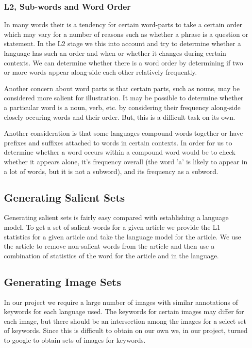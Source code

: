 \documentclass[12pt]{article}
\begin{document}
\subsubsection{L2, Sub-words and Word Order}
In many words their is a tendency for certain word-parts to take a certain order which may vary for a number of reasons such as whether a phrase is a question or statement. In the L2 stage we this into account and try to determine whether a language has such an order and when or whether it changes during certain contexts. We can determine whether there is a word order by determining if two or more words appear along-side each other relatively frequently.

Another concern about word parts is that certain parts, such as nouns, may be considered more salient for illustration. It may be possible to determine whether a particular word is a noun, verb, etc. by considering their frequency along-side closely occuring words and their order. But, this is a difficult task on its own.

Another consideration is that some languages compound words together or have prefixes and suffixes attached to words in certain contexts. 
In order for us to determine whether a word occurs within a compound word would be to check whether it appears alone, 
it's frequency overall (the word 'a' is likely to appear in a lot of words, but it is not a subword), and its frequency as a subword.

\subsection{Generating Salient Sets}
Generating salient sets is fairly easy compared with establishing a language model. To get a set of salient-words for a given article we provide the L1 statistics for a given article and take the language model for the article. We use the article to remove non-salient words from the article and then use a combination of statistics of the word for the article and in the language.

\subsection{Generating Image Sets}
In our project we require a large number of images with similar annotations of keywords for each language used. The keywords for certain images may differ for each image, but there should be an intersection among the images for a select set of keywords. Since this is difficult to obtain on our own we, in our project, turned to google to obtain sets of images for keywords.
\end{document}
